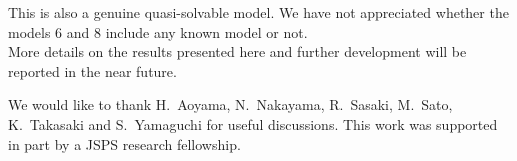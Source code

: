 \documentclass[a4paper,preprint,amsfonts,amssymb,amsmath,%
tightenlines,nofootinbib,noshowpacs]{revtex4}
\begin{document}
This is also a genuine quasi-solvable model. We have not appreciated
whether the models 6 and 8 include any known model or not.
\\

More details on the results presented here and further development
 will be reported in the near future.
\begin{acknowledgments}%
We would like to thank H.~Aoyama, N.~Nakayama, R.~Sasaki, M.~Sato,
 K.~Takasaki and S.~Yamaguchi for useful discussions.
This work was supported in part by a JSPS research fellowship.
\end{acknowledgments}%


%
\end{document}
